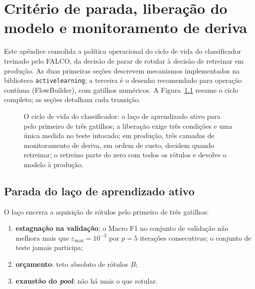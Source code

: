 \chapter{Critério de parada, liberação do modelo e monitoramento de deriva}
\label{ap:parada-drift}

Este apêndice consolida a política operacional do ciclo de vida do
classificador treinado pelo FALCO, da decisão de parar de rotular à decisão
de retreinar em produção. As duas primeiras seções descrevem mecanismos
implementados na biblioteca \texttt{activelearning}; a terceira é o desenho
recomendado para operação contínua (FlowBuilder), com gatilhos numéricos.
A Figura~\ref{fig:ap-ciclo-vida} resume o ciclo completo; as seções
detalham cada transição.

\begin{figure}[htbp]
    \centering
    
    \caption{O ciclo de vida do classificador: o laço de aprendizado ativo
    para pelo primeiro de três gatilhos; a liberação exige três condições e
    uma única medida no teste intocado; em produção, três camadas de
    monitoramento de deriva, em ordem de custo, decidem quando retreinar; o
    retreino parte do zero com todos os rótulos e devolve o modelo à
    produção.}
    \label{fig:ap-ciclo-vida}
\end{figure}

\section{Parada do laço de aprendizado ativo}
\label{ap:parada-laco}

O laço encerra a aquisição de rótulos pelo primeiro de três gatilhos:

\begin{enumerate}
  \item \textbf{estagnação na validação}: o Macro F1 no conjunto de
  validação não melhora mais que $\varepsilon_{\max}=10^{-3}$ por $p=5$
  iterações consecutivas; o conjunto de teste jamais participa;
  \item \textbf{orçamento}: teto absoluto de rótulos $B$;
  \item \textbf{exaustão do \textit{pool}}: não há mais o que rotular.
\end{enumerate}

